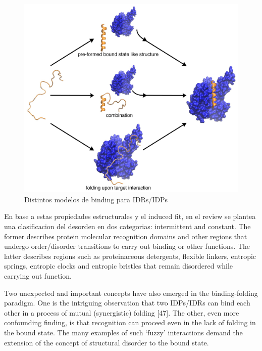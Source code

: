 \begin{figure}[h]
\centering
\includegraphics[width=\textwidth]{img/PSE-MoRE.jpg} 
\caption{Distintos modelos de binding para IDRs/IDPs} 
\label{idpBinding}
\end{figure}



En base a estas propiedades estructurales y el induced fit, en el review \cite{dunker2001intrinsically} se plantea una clasificacion del desorden en dos categorias: intermittent and constant.
The former describes protein molecular recognition domains and other regions that undergo order/disorder transitions to carry out binding or other functions. The latter describes regions such as
proteinaceous detergents, flexible linkers, entropic springs, entropic clocks and entropic bristles that remain disordered while carrying out function.

Two unexpected and important concepts have also emerged in the binding-folding paradigm. One is the intriguing observation that two IDPs/IDRs can bind each other in a process of mutual (synergistic) folding [47].
The other, even more confounding finding, is that recognition can proceed even in the lack of folding in the bound state. 
The many examples of such ‘fuzzy’ interactions demand the extension of the concept of structural disorder to the bound state.













